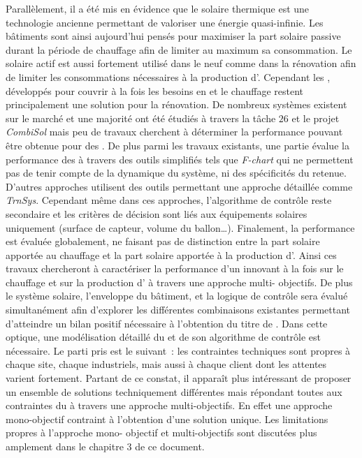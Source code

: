 Parallèlement, il a été mis en évidence que le solaire thermique est une technologie ancienne
permettant de valoriser une énergie quasi-infinie. Les bâtiments sont ainsi aujourd’hui
pensés pour maximiser la part solaire passive durant la période de chauffage afin de
limiter au maximum sa consommation. Le solaire actif est aussi fortement utilisé dans le
neuf comme dans la rénovation afin de limiter les consommations nécessaires à la
production d’. Cependant les , développés pour couvrir à la fois les
besoins en  et le chauffage restent principalement une solution pour la
rénovation. De nombreux systèmes existent sur le marché et une majorité ont été étudiés à
travers la tâche $26$ et le projet \textit{CombiSol} mais peu de travaux cherchent à
déterminer la performance pouvant être obtenue pour des . De plus parmi les
travaux existants, une partie évalue la performance des  à travers des outils
simplifiés tels que \textit{F-chart} qui ne permettent pas de tenir compte de la dynamique
du système, ni des spécificités du  retenue. D’autres approches utilisent des
outils permettant une approche détaillée comme \textit{TrnSys}. Cependant
même dans ces approches, l’algorithme de contrôle reste secondaire et les critères de
décision sont liés aux équipements solaires uniquement (surface de capteur, volume du
ballon\dots). Finalement, la performance est évaluée globalement, ne faisant pas de
distinction entre la part solaire apportée au chauffage et la part solaire apportée à la
production d’.
Ainsi ces travaux chercheront à caractériser la performance d’un  innovant à la
fois sur le chauffage et sur la production d’ à travers une approche multi-
objectifs. De plus le système solaire, l’enveloppe du bâtiment, et la logique de contrôle
sera évalué simultanément afin d’explorer les différentes combinaisons existantes
permettant d’atteindre un bilan positif nécessaire à l’obtention du titre de .
Dans cette optique, une modélisation détaillé du  et de son algorithme de
contrôle est nécessaire. Le parti pris est le suivant~: les contraintes techniques sont
propres à chaque site, chaque industriels, mais aussi à chaque client dont les attentes
varient fortement. Partant de ce constat, il apparaît plus intéressant de proposer
un ensemble de solutions techniquement différentes mais répondant toutes aux contraintes
du  à travers une approche multi-objectifs. En effet une approche mono-objectif
contraint à l’obtention d’une solution unique. Les limitations propres à l’approche mono-
objectif et multi-objectifs sont discutées plus amplement dans le chapitre $3$ de ce
document.


